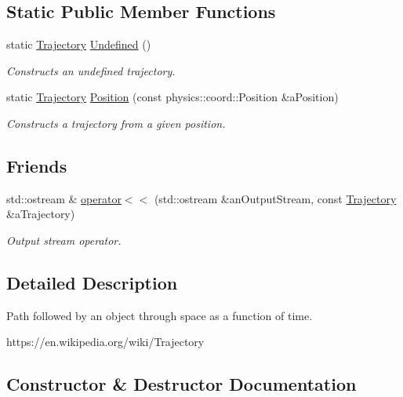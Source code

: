 \subsection*{Static Public Member Functions}
\begin{DoxyCompactItemize}
\item 
static \hyperlink{classostk_1_1astro_1_1_trajectory}{Trajectory} \hyperlink{classostk_1_1astro_1_1_trajectory_a87873d63cae80dff7e43c97dc9b3668f}{Undefined} ()
\begin{DoxyCompactList}\small\item\em Constructs an undefined trajectory. \end{DoxyCompactList}\item 
static \hyperlink{classostk_1_1astro_1_1_trajectory}{Trajectory} \hyperlink{classostk_1_1astro_1_1_trajectory_ae98d1466450030f73a83567c8cc1471a}{Position} (const physics\+::coord\+::\+Position \&a\+Position)
\begin{DoxyCompactList}\small\item\em Constructs a trajectory from a given position. \end{DoxyCompactList}\end{DoxyCompactItemize}
\subsection*{Friends}
\begin{DoxyCompactItemize}
\item 
std\+::ostream \& \hyperlink{classostk_1_1astro_1_1_trajectory_aef0327f0240dc2d71eca34dc287f88ea}{operator$<$$<$} (std\+::ostream \&an\+Output\+Stream, const \hyperlink{classostk_1_1astro_1_1_trajectory}{Trajectory} \&a\+Trajectory)
\begin{DoxyCompactList}\small\item\em Output stream operator. \end{DoxyCompactList}\end{DoxyCompactItemize}


\subsection{Detailed Description}
Path followed by an object through space as a function of time. 

https\+://en.wikipedia.\+org/wiki/\+Trajectory 

\subsection{Constructor \& Destructor Documentation}
\mbox{\label{classostk_1_1astro_1_1_trajectory_a9333200bd6afed5aef4f5aad8a2a8e84}} 
